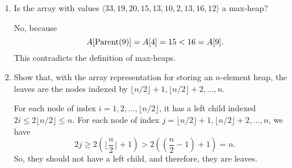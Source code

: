 \documentclass[12pt,reqno]{amsart}
\newif\ifanswer
\begin{document}
\begin{enumerate}[1.]
\item Is the array with values $\langle 33, 19, 20, 15, 13, 10, 2, 13, 16, 12 \rangle$ a max-heap?

\ifanswer
{}
No, because
$$
A[\textup{Parent}(9)] = A[4] = 15 < 16 = A[9].
$$
This contradicts the definition of max-heaps.
\vspace{1cm}



\item Show that, with the array representation for storing an $n$-element heap, the leaves are the nodes indexed by $\lfloor n/2\rfloor+1, \lfloor n/2\rfloor+2, \dots, n$.

\ifanswer
{}
For each node of index $i = 1, 2, \dots, \lfloor n/2\rfloor$, it has a left child indexed $2i \leq 2\lfloor n/2\rfloor \leq n$. For each node of index $j = \lfloor n/2\rfloor+1, \lfloor n/2\rfloor+2, \dots, n$, we have
$$
2j \geq 2(\lfloor \frac{n}{2}\rfloor + 1) > 2\left((\frac{n}{2} - 1) + 1\right) = n.
$$
So, they should not have a left child, and therefore, they are leaves.
\vspace{1cm}



\end{enumerate}
\end{document}
